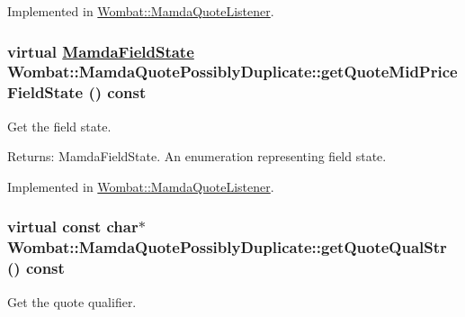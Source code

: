 Implemented in \hyperlink{classWombat_1_1MamdaQuoteListener_b74788d3c90fce551bab93ed062a0458}{Wombat::Mamda\-Quote\-Listener}.\hypertarget{classWombat_1_1MamdaQuotePossiblyDuplicate_f4b38e9cb0c15e3a3956d5171582fd75}{
\subsubsection[getQuoteMidPriceFieldState]{\setlength{\rightskip}{0pt plus 5cm}virtual \hyperlink{namespaceWombat_93aac974f2ab713554fd12a1fa3b7d2a}{Mamda\-Field\-State} Wombat::Mamda\-Quote\-Possibly\-Duplicate::get\-Quote\-Mid\-Price\-Field\-State () const}}
\label{classWombat_1_1MamdaQuotePossiblyDuplicate_f4b38e9cb0c15e3a3956d5171582fd75}


Get the field state. 

\begin{Desc}
\item[Returns:]Mamda\-Field\-State. An enumeration representing field state. \end{Desc}


Implemented in \hyperlink{classWombat_1_1MamdaQuoteListener_19d19b0f64db3586e14b88f4a502ecbf}{Wombat::Mamda\-Quote\-Listener}.\hypertarget{classWombat_1_1MamdaQuotePossiblyDuplicate_34e7748f7bb365980650c6a541d2a9b9}{
\subsubsection[getQuoteQualStr]{\setlength{\rightskip}{0pt plus 5cm}virtual const char$\ast$ Wombat::Mamda\-Quote\-Possibly\-Duplicate::get\-Quote\-Qual\-Str () const}}
\label{classWombat_1_1MamdaQuotePossiblyDuplicate_34e7748f7bb365980650c6a541d2a9b9}


Get the quote qualifier. 

